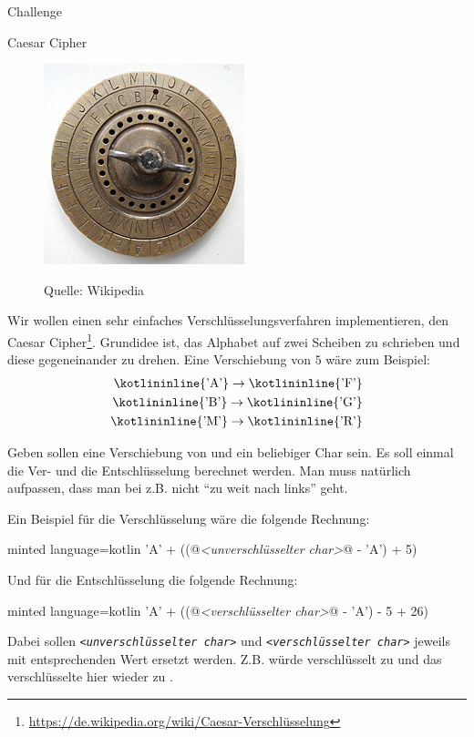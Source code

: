 \begin{task}[points=auto]{Challenge}
    \begin{subtask*}[points=0]{Caesar Cipher }
        \begin{figure}
            \begin{center}
                \includegraphics{caesar-cipher.jpg}
            \end{center}
            Quelle: Wikipedia
        \end{figure}
        Wir wollen einen sehr einfaches Verschlüsselungsverfahren implementieren, den Caesar Cipher\footnote{\url{https://de.wikipedia.org/wiki/Caesar-Verschlüsselung}}.
        Grundidee ist, das Alphabet auf zwei Scheiben zu schrieben und diese gegeneinander zu drehen.
        Eine Verschiebung von $5$ wäre zum Beispiel:
        \begin{align*}
            \text{\kotlininline{'A'}} \to \text{\kotlininline{'F'}} \\
            \text{\kotlininline{'B'}} \to \text{\kotlininline{'G'}} \\
            \text{\kotlininline{'M'}} \to \text{\kotlininline{'R'}}
        \end{align*}

        Geben sollen eine Verschiebung von  und ein beliebiger Char sein.
        Es soll einmal die Ver- und die Entschlüsselung berechnet werden.
        Man muss natürlich aufpassen, dass man bei z.B.
         nicht \enquote{zu weit nach links} geht.

        \begin{solution}
            Ein Beispiel für die Verschlüsselung wäre die folgende Rechnung:
            \begin{codeBlock}[]{minted language=kotlin}
                'A' + ((@\textit{\color{accentcolor}<unverschlüsselter char>}@ - 'A') + 5) %
            \end{codeBlock}
            Und für die Entschlüsselung die folgende Rechnung:
            \begin{codeBlock}[]{minted language=kotlin}
                'A' + ((@\textit{\color{accentcolor}<verschlüsselter char>}@ - 'A') - 5 + 26) %
            \end{codeBlock}
            Dabei sollen \texttt{\textit{\color{accentcolor}<unverschlüsselter char>}} und \texttt{\textit{\color{accentcolor}<verschlüsselter char>}} jeweils mit entsprechenden Wert ersetzt werden.
            Z.B. würde  verschlüsselt zu  und das verschlüsselte  hier wieder zu .


\end{solution}
\end{subtask*}
\end{task}
